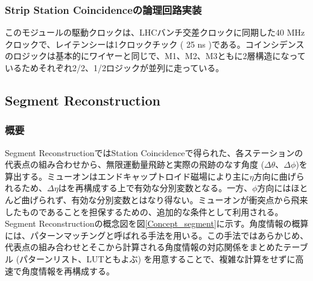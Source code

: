 \subsubsection*{Strip Station Coincidenceの論理回路実装}
このモジュールの駆動クロックは、LHCバンチ交差クロックに同期した40 MHzクロックで、レイテンシーは1クロックチック ( 25 ns )である。コインシデンスのロジックは基本的にワイヤーと同じで、M1、M2、M3ともに2層構造になっているためそれぞれ2/2、1/2ロジックが並列に走っている。


\subsection{Segment Reconstruction}
\label{subsec:segment_reco}
\subsubsection*{概要}
Segment ReconstructionではStation Coincidenceで得られた、各ステーションの代表点の組み合わせから、無限運動量飛跡と実際の飛跡のなす角度 ($\Delta\theta$、$\Delta\phi$)を算出する。ミューオンはエンドキャップトロイド磁場により主に$\eta$方向に曲げられるため、$\Delta\eta$は\pt を再構成する上で有効な分別変数となる。一方、$\phi$方向にはほとんど曲げられず、有効な分別変数とはなり得ない。ミューオンが衝突点から飛来したものであることを担保するための、追加的な条件として利用される。Segment Reconstructionの概念図を図\ref{Concept_segment}に示す。角度情報の概算には、パターンマッチングと呼ばれる手法を用いる。この手法ではあらかじめ、代表点の組み合わせとそこから計算される角度情報の対応関係をまとめたテーブル (パターンリスト、LUTともよぶ) を用意することで、複雑な計算をせずに高速で角度情報を再構成する。

